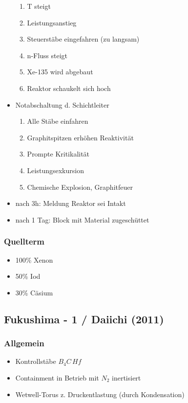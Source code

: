 \documentclass[12pt]{article}
\begin{document}
\begin{itemize}
		\begin{enumerate}[label = \textrightarrow]
			\item T steigt
			\item Leistungsanstieg
			\item Steuerstäbe eingefahren (zu langsam)
			\item n-Fluss steigt
			\item Xe-135 wird abgebaut
			\item Reaktor schaukelt sich hoch
		\end{enumerate}
	\item Notabschaltung d. Schichtleiter
		\begin{enumerate}[label = \textrightarrow]
			\item Alle Stäbe einfahren
			\item Graphitspitzen erhöhen Reaktivität
			\item Prompte Kritikalität
			\item Leistungsexkursion
			\item Chemische Explosion, Graphitfeuer
		\end{enumerate}
	\item nach 3h: Meldung Reaktor sei Intakt
	\item nach 1 Tag: Block mit Material zugeschüttet

\end{itemize}

\subsubsection{Quellterm}
\begin{itemize}
	\item 100\% Xenon
	\item 50\% Iod
	\item 30\% Cäsium
\end{itemize}

\subsection{Fukushima - 1 / Daiichi (2011)}

\subsubsection{Allgemein}
\begin{itemize}
	\item Kontrollstäbe \(B_4C\, Hf\)
	\item Containment in Betrieb mit \(N_2\) inertisiert
	\item Wetwell-Torus z. Druckentlastung (durch Kondensation)
\end{itemize}
\end{document}
